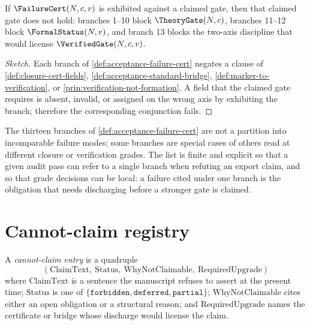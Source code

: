\begin{theorem}
\label{thm:acceptance-failure-blocks-gate}
If $\FailureCert(N, c, v)$ is exhibited against a claimed gate, then that claimed gate does not hold: branches 1--10 block $\TheoryGate(N, c)$, branches 11--12 block $\FormalStatus(N, v)$, and branch 13 blocks the two-axis discipline that would license $\VerifiedGate(N, c, v)$.
\end{theorem}
\begin{proof}[Sketch]
Each branch of \autoref{def:acceptance-failure-cert} negates a clause of \autoref{def:closure-cert-fields}, \autoref{def:acceptance-standard-bridge}, \autoref{def:marker-to-verification}, or \autoref{prin:verification-not-formation}. A field that the claimed gate requires is absent, invalid, or assigned on the wrong axis by exhibiting the branch; therefore the corresponding conjunction fails.
\end{proof}

\begin{remark}
\label{rem:acceptance-thirteen-branches-rationale}
The thirteen branches of \autoref{def:acceptance-failure-cert} are not a partition into incomparable failure modes; some branches are special cases of others read at different closure or verification grades. The list is finite and explicit so that a given audit pass can refer to a single branch when refuting an export claim, and so that grade decisions can be local: a failure cited under one branch is the obligation that needs discharging before a stronger gate is claimed.
\end{remark}

\section{Cannot-claim registry}
\label{sec:acceptance-cannot-claim-registry}

\begin{definition}
\label{def:acceptance-cannot-claim-entry}
A \emph{cannot-claim entry} is a quadruple
$$
  (\mathrm{ClaimText},\ \mathrm{Status},\ \mathrm{WhyNotClaimable},\ \mathrm{RequiredUpgrade})
$$
where $\mathrm{ClaimText}$ is a sentence the manuscript refuses to assert at the present time; $\mathrm{Status}$ is one of $\{\mathtt{forbidden}, \mathtt{deferred}, \mathtt{partial}\}$; $\mathrm{WhyNotClaimable}$ cites either an open obligation or a structural reason; and $\mathrm{RequiredUpgrade}$ names the certificate or bridge whose discharge would license the claim.
\end{definition}

